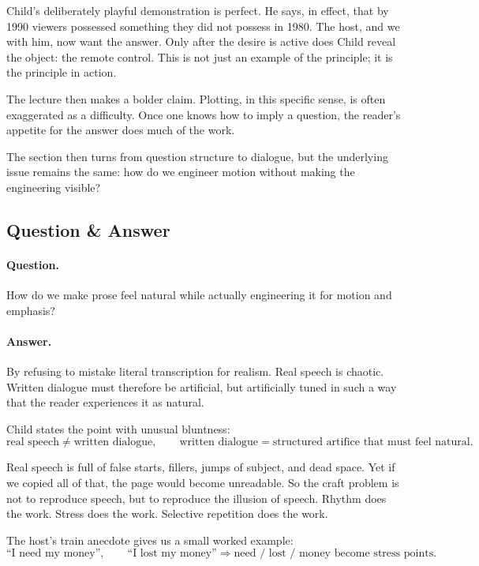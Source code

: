 Child's deliberately playful demonstration is perfect. He says, in effect, that by 1990 viewers possessed something they did not possess in 1980. The host, and we with him, now want the answer. Only after the desire is active does Child reveal the object: the remote control. This is not just an example of the principle; it is the principle in action.

The lecture then makes a bolder claim. Plotting, in this specific sense, is often exaggerated as a difficulty. Once one knows how to imply a question, the reader's appetite for the answer does much of the work.

The section then turns from question structure to dialogue, but the underlying issue remains the same: how do we engineer motion without making the engineering visible?

\subsection{Question \& Answer}

\paragraph{Question.} How do we make prose feel natural while actually engineering it for motion and emphasis?

\paragraph{Answer.} By refusing to mistake literal transcription for realism. Real speech is chaotic. Written dialogue must therefore be artificial, but artificially tuned in such a way that the reader experiences it as natural.

Child states the point with unusual bluntness:
\begin{equation}
\text{real speech} \neq \text{written dialogue},
\qquad
\text{written dialogue} = \text{structured artifice that must feel natural}.
\end{equation}

Real speech is full of false starts, fillers, jumps of subject, and dead space. Yet if we copied all of that, the page would become unreadable. So the craft problem is not to reproduce speech, but to reproduce the illusion of speech. Rhythm does the work. Stress does the work. Selective repetition does the work.

The host's train anecdote gives us a small worked example:
\begin{equation}
\text{``I need my money''}, \qquad \text{``I lost my money''}
\Longrightarrow
\text{need / lost / money become stress points.}
\end{equation}

